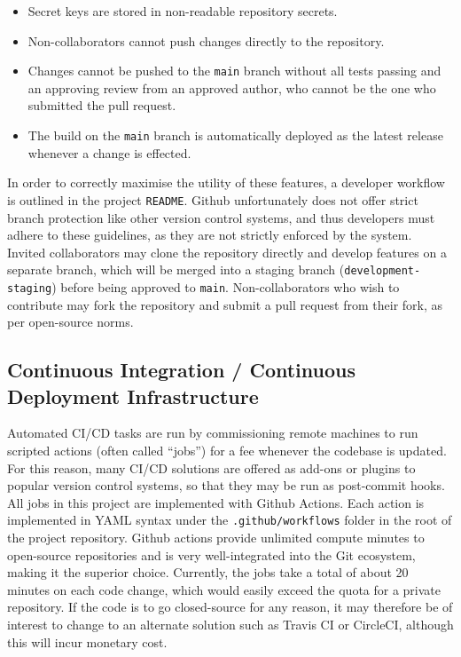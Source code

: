 \begin{itemize}
    \item Secret keys are stored in non-readable repository secrets.
    \item Non-collaborators cannot push changes directly to the repository.
    \item Changes cannot be pushed to the \texttt{main} branch without all tests passing and an approving review from an approved author, who cannot be the one who submitted the pull request.
    \item The build on the \texttt{main} branch is automatically deployed as the latest release whenever a change is effected.
\end{itemize}

In order to correctly maximise the utility of these features, a developer workflow is outlined in the project \texttt{README}. Github unfortunately does not offer strict branch protection like other version control systems, and thus developers must adhere to these guidelines, as they are not strictly enforced by the system. Invited collaborators may clone the repository directly and develop features on a separate branch, which will be merged into a staging branch (\texttt{development-staging}) before being approved to \texttt{main}. Non-collaborators who wish to contribute may fork the repository and submit a pull request from their fork, as per open-source norms.


\subsection{Continuous Integration / Continuous Deployment Infrastructure}
Automated CI/CD tasks are run by commissioning remote machines to run scripted actions (often called ``jobs'') for a fee whenever the codebase is updated. For this reason, many CI/CD solutions are offered as add-ons or plugins to popular version control systems, so that they may be run as post-commit hooks. All jobs in this project are implemented with Github Actions. Each action is implemented in YAML syntax under the \texttt{.github/workflows} folder in the root of the project repository. Github actions provide unlimited compute minutes to open-source repositories and is very well-integrated into the Git ecosystem, making it the superior choice. Currently, the jobs take a total of about 20 minutes on each code change, which would easily exceed the quota for a private repository. If the code is to go closed-source for any reason, it may therefore be of interest to change to an alternate solution such as Travis CI or CircleCI, although this will incur monetary cost.



